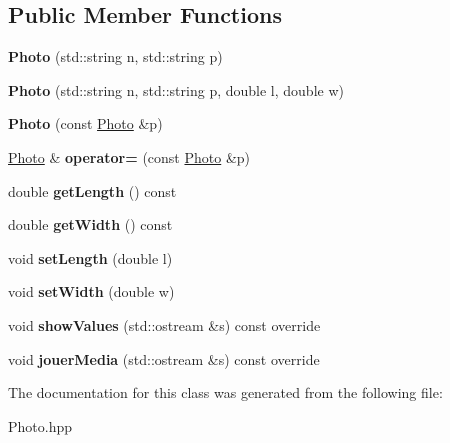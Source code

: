 \subsection*{Public Member Functions}
\begin{DoxyCompactItemize}
\item 
\mbox{\label{class_photo_abe4de29e29c5fd9aaccc91043db65f81}} 
{\bfseries Photo} (std\+::string n, std\+::string p)
\item 
\mbox{\label{class_photo_a9f78818a0957e06f05d298cecf585f9e}} 
{\bfseries Photo} (std\+::string n, std\+::string p, double l, double w)
\item 
\mbox{\label{class_photo_a8557683bcbef0cdf105a39b0b7f06cff}} 
{\bfseries Photo} (const \mbox{\hyperlink{class_photo}{Photo}} \&p)
\item 
\mbox{\label{class_photo_a30c984a9c5e35db4dbe26a677bd9b5ba}} 
\mbox{\hyperlink{class_photo}{Photo}} \& {\bfseries operator=} (const \mbox{\hyperlink{class_photo}{Photo}} \&p)
\item 
\mbox{\label{class_photo_ab6a5d8f0059a13ca98afcad36889259a}} 
double {\bfseries get\+Length} () const
\item 
\mbox{\label{class_photo_a31593ab6044b5a7f3020a97608bf3a4e}} 
double {\bfseries get\+Width} () const
\item 
\mbox{\label{class_photo_a95f049dd09bf9a2b307c7e70383acdc1}} 
void {\bfseries set\+Length} (double l)
\item 
\mbox{\label{class_photo_a558b982c8c74c52d8feda5bcc11aea87}} 
void {\bfseries set\+Width} (double w)
\item 
\mbox{\label{class_photo_ab856a2c0085aec7701a4885852ac1314}} 
void {\bfseries show\+Values} (std\+::ostream \&s) const override
\item 
\mbox{\label{class_photo_a9a446293a4a6207459338428b88988e8}} 
void {\bfseries jouer\+Media} (std\+::ostream \&s) const override
\end{DoxyCompactItemize}


The documentation for this class was generated from the following file\+:\begin{DoxyCompactItemize}
\item 
Photo.\+hpp\end{DoxyCompactItemize}
